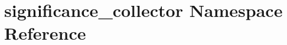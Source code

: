 \hypertarget{namespacesignificance__collector}{
\section{significance\_\-collector Namespace Reference}
\label{namespacesignificance__collector}
}
